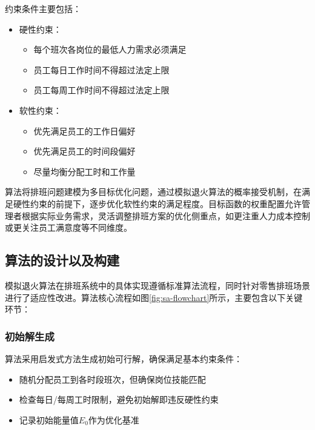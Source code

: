 \documentclass{ctexart}
\begin{document}
约束条件主要包括：
\begin{itemize}
    \item 硬性约束：
    \begin{itemize}
        \item 每个班次各岗位的最低人力需求必须满足
        \item 员工每日工作时间不得超过法定上限
        \item 员工每周工作时间不得超过法定上限
    \end{itemize}
    \item 软性约束：
    \begin{itemize}
        \item 优先满足员工的工作日偏好
        \item 优先满足员工的时间段偏好
        \item 尽量均衡分配工时和工作量
    \end{itemize}
\end{itemize}

算法将排班问题建模为多目标优化问题，通过模拟退火算法的概率接受机制，在满足硬性约束的前提下，逐步优化软性约束的满足程度。目标函数的权重配置允许管理者根据实际业务需求，灵活调整排班方案的优化侧重点，如更注重人力成本控制或更关注员工满意度等不同维度。

\subsection{算法的设计以及构建}
模拟退火算法在排班系统中的具体实现遵循标准算法流程，同时针对零售排班场景进行了适应性改进。算法核心流程如图\ref{fig:sa-flowchart}所示，主要包含以下关键环节：


\subsubsection{初始解生成}
算法采用启发式方法生成初始可行解，确保满足基本约束条件：
\begin{itemize}
    \item 随机分配员工到各时段班次，但确保岗位技能匹配
    \item 检查每日/每周工时限制，避免初始解即违反硬性约束
    \item 记录初始能量值$E_0$作为优化基准
\end{itemize}
\end{document}
